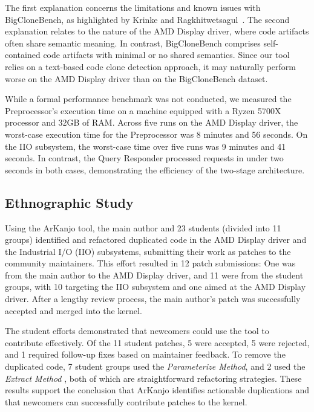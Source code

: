 \documentclass[conference]{IEEEtran}
\begin{document}
The first explanation concerns the limitations and known issues with BigCloneBench, as
highlighted by Krinke and Ragkhitwetsagul~\cite{bigfail}. The
second explanation relates to the nature of the AMD Display driver, where code artifacts
often share semantic meaning. In contrast, BigCloneBench comprises self-contained code
artifacts with minimal or no shared semantics. Since our tool relies on a text-based code clone
detection approach, it may naturally perform worse on the AMD Display driver than on the
BigCloneBench dataset.


While a formal performance benchmark was not conducted, we measured the Preprocessor's execution 
time on a machine equipped with a Ryzen 5700X processor and 32GB of RAM. Across five runs on the 
AMD Display driver, the worst-case execution time for the Preprocessor was 8 minutes and 56 seconds. 
On the IIO subsystem, the worst-case time over five runs was 9 minutes and 41 seconds. 
In contrast, the Query Responder processed requests in under two seconds in both cases, 
demonstrating the efficiency of the two-stage architecture.

\subsection{Ethnographic Study}

Using the ArKanjo tool, the main author and 23 students (divided into 11 groups) identified and refactored 
duplicated code in the AMD Display driver and the Industrial I/O (IIO) subsystems, submitting their work 
as patches to the community maintainers. This effort resulted in 12 patch submissions: 
One was from the main author to the AMD Display driver, and 11 were from the student groups, with 10 targeting 
the IIO subsystem and one aimed at the AMD Display driver. After a lengthy review process, the main author's patch 
was successfully accepted and merged into the kernel.

The student efforts demonstrated that newcomers could use the tool to contribute effectively. 
Of the 11 student patches, 5 were accepted, 5 were rejected, and 1 required follow-up 
fixes based on maintainer feedback. To remove the duplicated code, 7 student groups used the 
\textit{Parameterize Method}, and 2 used the \textit{Extract Method} \cite{refactorbook}, both of which are 
straightforward refactoring strategies. These results support the conclusion that ArKanjo identifies 
actionable duplications and that newcomers can successfully contribute patches to the kernel.
\end{document}
